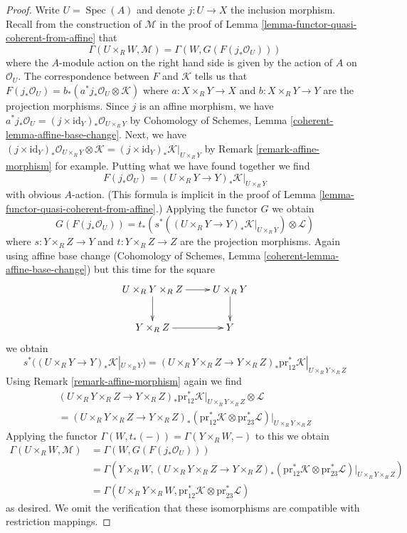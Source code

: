 \documentclass[10pt,a4paper]{amsart}
\theoremstyle{plain}
\theoremstyle{definition}
\theoremstyle{remark}
\numberwithin{equation}{subsection}
\def\Spec{\mathop{\mathrm{Spec}}}
\begin{document}
\begin{proof}
\medskip\noindent
Write $U = \Spec(A)$ and denote $j : U \to X$ the inclusion morphism.
Recall from the construction of $\mathcal{M}$ in the proof of
Lemma \ref{lemma-functor-quasi-coherent-from-affine} that
$$
\Gamma(U \times_R W, \mathcal{M}) =
\Gamma(W, G(F(j_*\mathcal{O}_U)))
$$
where the $A$-module action on the right hand side is given by
the action of $A$ on $\mathcal{O}_U$. The correspondence between
$F$ and $\mathcal{K}$ tells us that
$F(j_*\mathcal{O}_U) = b_*(a^*j_*\mathcal{O}_U \otimes \mathcal{K})$
where $a : X \times_R Y \to X$ and $b : X \times_R Y \to Y$ are
the projection morphisms. Since $j$ is an affine morphism, we have
$a^*j_*\mathcal{O}_U = (j \times \text{id}_Y)_*\mathcal{O}_{U \times_R Y}$
by Cohomology of Schemes, Lemma
\ref{coherent-lemma-affine-base-change}.
Next, we have
$(j \times \text{id}_Y)_*\mathcal{O}_{U \times_R Y} \otimes \mathcal{K} =
(j \times \text{id}_Y)_*\mathcal{K}|_{U \times_R Y}$
by Remark \ref{remark-affine-morphism} for example.
Putting what we have found together we find
$$
F(j_*\mathcal{O}_U) =
(U \times_R Y \to Y)_*\mathcal{K}|_{U \times_R Y}
$$
with obvious $A$-action. (This formula is implicit in the proof
of Lemma \ref{lemma-functor-quasi-coherent-from-affine}.)
Applying the functor $G$ we obtain
$$
G(F(j_*\mathcal{O}_U)) =
t_*(s^*((U \times_R Y \to Y)_*\mathcal{K}|_{U \times_R Y})
\otimes \mathcal{L})
$$
where $s : Y \times_R Z \to Y$ and $t : Y \times_R Z \to Z$ are
the projection morphisms. Again using affine base change
(Cohomology of Schemes, Lemma \ref{coherent-lemma-affine-base-change})
but this time for the square
$$
\xymatrix{
U \times_R Y \times_R Z \ar[r] \ar[d] & U \times_R Y \ar[d] \\
Y \times_R Z \ar[r] & Y
}
$$
we obtain
$$
s^*((U \times_R Y \to Y)_*\mathcal{K}|_{U \times_R Y}) =
(U \times_R Y \times_R Z \to Y \times_R Z)_*
\text{pr}_{12}^*\mathcal{K}|_{U \times_R Y \times_R Z}
$$
Using Remark \ref{remark-affine-morphism} again we find
\begin{align*}
(U \times_R Y \times_R Z \to Y \times_R Z)_*
\text{pr}_{12}^*\mathcal{K}|_{U \times_R Y \times_R Z}
\otimes \mathcal{L} \\
=
(U \times_R Y \times_R Z \to Y \times_R Z)_*
\left(\text{pr}_{12}^*\mathcal{K} \otimes
\text{pr}_{23}^*\mathcal{L}\right)|_{U \times_R Y \times_R Z}
\end{align*}
Applying the functor $\Gamma(W, t_*(-)) = \Gamma(Y \times_R W, -)$
to this we obtain
\begin{align*}
\Gamma(U \times_R W, \mathcal{M})
& =
\Gamma(W, G(F(j_*\mathcal{O}_U))) \\
& =
\Gamma(Y \times_R W, (U \times_R Y \times_R Z \to Y \times_R Z)_*
(\text{pr}_{12}^*\mathcal{K} \otimes
\text{pr}_{23}^*\mathcal{L})|_{U \times_R Y \times_R Z}) \\
& =
\Gamma(U \times_R Y \times_R W,
\text{pr}_{12}^*\mathcal{K} \otimes \text{pr}_{23}^*\mathcal{L})
\end{align*}
as desired. We omit the verification that these isomorphisms are
compatible with restriction mappings.
\end{proof}
\end{document}

